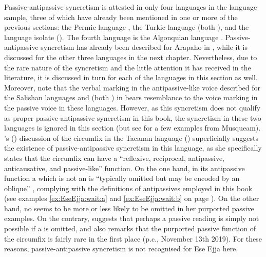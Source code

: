 Passive-antipassive syncretism is attested in only four languages in the language sample, three of which have already been mentioned in one or more of the previous sections: the Permic language , the Turkic language  (both ), and the language isolate  (). The fourth language is the Algonquian language . Passive-antipassive syncretism has already been described for Arapaho in , while it is discussed for the other three languages in the next chapter. Nevertheless, due to the rare nature of the syncretism and the little attention it has received in the literature, it is discussed in turn for each of the languages in this section as well. Moreover, note that the verbal marking in the antipassive-like voice described for the Salishan languages  and  (both ) in  bears resemblance to the voice marking in the passive voice in these languages. However, as this syncretism does not qualify as proper passive-antipassive syncretism in this book, the syncretism in these two languages is ignored in this section (but see  for a few examples from Musqueam). \citeauthor{vuillermet:2012}’s (\citeyear[519]{vuillermet:2012}) discussion of the circumfix  in the Tacanan language  () superficially suggests the existence of passive-antipassive syncretism in this language, as she specifically states that the circumfix can have a “reflexive, reciprocal, antipassive, anticausative, and passive-like” function. On the one hand, in its antipassive function a  which is not an  is “typically omitted but may be encoded by an oblique” \citep[520]{vuillermet:2012}, complying with the definitions of antipassives employed in this book (see examples \ref{ex:EseEjja:wait:a} and \ref{ex:EseEjja:wait:b} on page \pageref{ex:EseEjja:wait:a}). On the other hand, no  seems to be more or less likely to be omitted in her purported passive examples. On the contrary, \citeauthor{vuillermet:2012} suggests that perhaps a passive reading is simply not possible if a  is omitted, and also remarks that the purported passive function of the circumfix is fairly rare in the first place (p.c., November 13th 2019). For these reasons, passive-antipassive syncretism is not recognised for Ese Ejja here.

